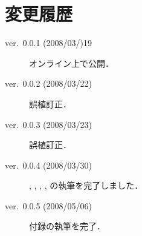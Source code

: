 \chapter{変更履歴}

\begin{description}
 \item[ver.~0.0.1 (2008/03/)19] 
    オンライン上で公開．
 \item[ver.~0.0.2 (2008/03/22)] 
    誤植訂正．
 \item[ver.~0.0.3 (2008/03/23)]
    誤植訂正．
 \item[ver.~0.0.4 (2008/03/30)]
    , , , ,
     の執筆を完了しました．
 \item[ver.~0.0.5 (2008/05/06)]
    付録の執筆を完了．
\end{description}
